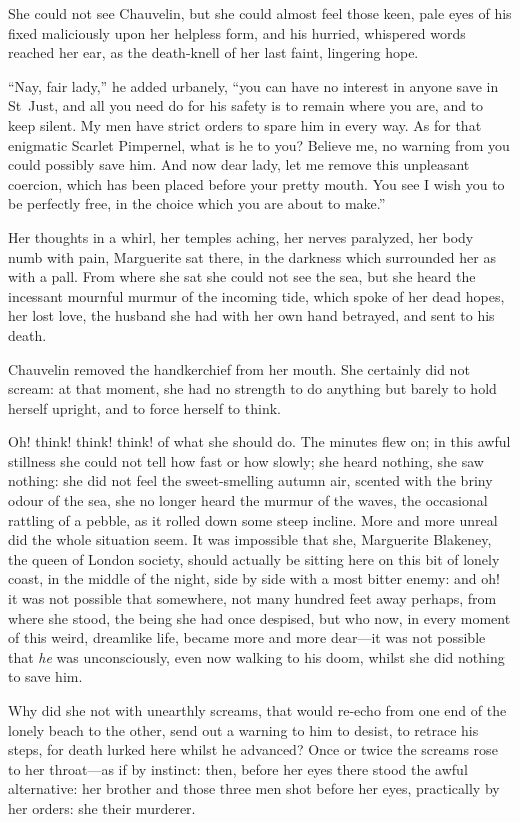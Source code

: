 She could not see Chauvelin, but she could almost feel those keen, pale eyes of his fixed maliciously upon her helpless form, and his hurried, whispered words reached her ear, as the death-knell of her last faint, lingering hope.

\enquote{Nay, fair lady,} he added urbanely, \enquote{you can have no interest in anyone save in St~Just, and all you need do for his safety is to remain where you are, and to keep silent. My men have strict orders to spare him in every way. As for that enigmatic Scarlet Pimpernel, what is he to you? Believe me, no warning from you could possibly save him. And now dear lady, let me remove this unpleasant coercion, which has been placed before your pretty mouth. You see I wish you to be perfectly free, in the choice which you are about to make.}

Her thoughts in a whirl, her temples aching, her nerves paralyzed, her body numb with pain, Marguerite sat there, in the darkness which surrounded her as with a pall. From where she sat she could not see the sea, but she heard the incessant mournful murmur of the incoming tide, which spoke of her dead hopes, her lost love, the husband she had with her own hand betrayed, and sent to his death.

Chauvelin removed the handkerchief from her mouth. She certainly did not scream: at that moment, she had no strength to do anything but barely to hold herself upright, and to force herself to think.

Oh! think! think! think! of what she should do. The minutes flew on; in this awful stillness she could not tell how fast or how slowly; she heard nothing, she saw nothing: she did not feel the sweet-smelling autumn air, scented with the briny odour of the sea, she no longer heard the murmur of the waves, the occasional rattling of a pebble, as it rolled down some steep incline. More and more unreal did the whole situation seem. It was impossible that she, Marguerite Blakeney, the queen of London society, should actually be sitting here on this bit of lonely coast, in the middle of the night, side by side with a most bitter enemy: and oh! it was not possible that somewhere, not many hundred feet away perhaps, from where she stood, the being she had once despised, but who now, in every moment of this weird, dreamlike life, became more and more dear---it was not possible that \textit{he} was unconsciously, even now walking to his doom, whilst she did nothing to save him.

Why did she not with unearthly screams, that would re-echo from one end of the lonely beach to the other, send out a warning to him to desist, to retrace his steps, for death lurked here whilst he advanced? Once or twice the screams rose to her throat---as if by instinct: then, before her eyes there stood the awful alternative: her brother and those three men shot before her eyes, practically by her orders: she their murderer.

